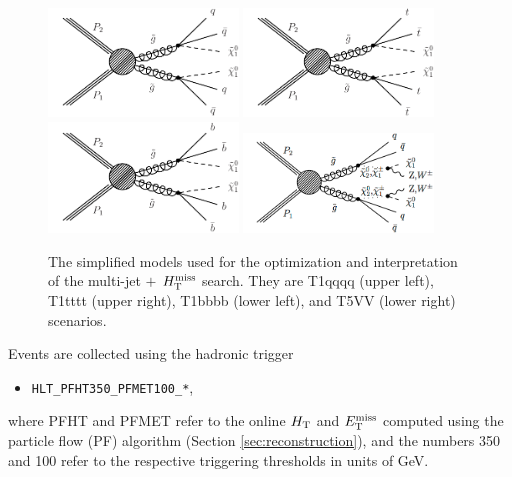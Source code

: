 \begin{figure}[tb!]
\centering
\includegraphics[width=0.45\textwidth]{figures/SusySearches/Ra2b2015/T1qqqq.pdf}
\includegraphics[width=0.45\textwidth]{figures/SusySearches/Ra2b2015/T1tttt.pdf}\\
\includegraphics[width=0.45\textwidth]{figures/SusySearches/Ra2b2015/T1bbbb.pdf}
\includegraphics[width=0.45\textwidth]{figures/SusySearches/Ra2b2015/T5vv.pdf}
\caption{
  The simplified models used for the optimization and interpretation of the multi-jet $+$ $H_{\text{T}}^{\rm miss}$ search. 
  They are T1qqqq (upper left), T1tttt (upper right), T1bbbb (lower left), and T5VV (lower right) scenarios.
}
\label{fig:Ra2bSMS}
\end{figure}

Events are collected using the hadronic trigger
\begin{itemize}
  \item \texttt{HLT\_PFHT350\_PFMET100\_*},
\end{itemize}
where PFHT and PFMET refer to the online $H_{\rm T}$ and $E_{\text{T}}^{\rm miss}$ computed using the particle flow (PF) algorithm (Section \ref{sec:reconstruction}), and the numbers 350 and 100 refer to the respective triggering thresholds in units of GeV.

